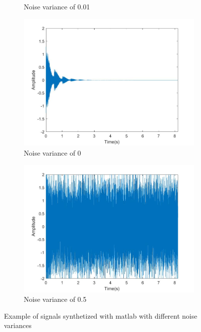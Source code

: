 \begin{figure}[]
\begin{subfigure}{0.45\textwidth}
        \caption{Noise variance of 0.01}{}
    \end{subfigure}
    \begin{subfigure}{0.45\textwidth}
        \centering
        \includegraphics[width=\linewidth]{Chapters/6CHP/Figures/signal3.jpg}
        \caption{Noise variance of 0}{}
    \end{subfigure}
    \begin{subfigure}{0.45\textwidth}
        \centering
        \includegraphics[width=\linewidth]{Chapters/6CHP/Figures/signal4.jpg}
        \caption{Noise variance of 0.5}{}
    \end{subfigure}
    \caption{Example of signals synthetized with \acrshort{matlab} with different noise variances}{}
     \label{fig:synthetizedSignal}
 \end{figure}
